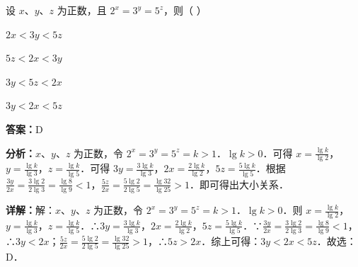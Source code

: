 \begin{question}[points=5]
设 $x$、$y$、$z$ 为正数，且 $2^x=3^y=5^z$，则（ ）
\begin{choices}
  \item $2x<3y<5z$
  \item $5z<2x<3y$
  \item $3y<5z<2x$
  \item $3y<2x<5z$
\end{choices}
\begin{solution}
\textbf{答案：}D

\textbf{分析：}$x$、$y$、$z$ 为正数，令 $2^x=3^y=5^z=k>1$．$\lg k>0$．可得 $x=\frac{\lg k}{\lg 2}$，$y=\frac{\lg k}{\lg 3}$，$z=\frac{\lg k}{\lg 5}$．可得 $3y=\frac{3\lg k}{\lg 3}$，$2x=\frac{2\lg k}{\lg 2}$，$5z=\frac{5\lg k}{\lg 5}$．根据 $\frac{3y}{2x}=\frac{3\lg 2}{2\lg 3}=\frac{\lg 8}{\lg 9}<1$，$\frac{5z}{2x}=\frac{5\lg 2}{2\lg 5}=\frac{\lg 32}{\lg 25}>1$．即可得出大小关系．

\textbf{详解：}解：$x$、$y$、$z$ 为正数，令 $2^x=3^y=5^z=k>1$．$\lg k>0$．则 $x=\frac{\lg k}{\lg 2}$，$y=\frac{\lg k}{\lg 3}$，$z=\frac{\lg k}{\lg 5}$．∴$3y=\frac{3\lg k}{\lg 3}$，$2x=\frac{2\lg k}{\lg 2}$，$5z=\frac{5\lg k}{\lg 5}$．∵$\frac{3y}{2x}=\frac{3\lg 2}{2\lg 3}=\frac{\lg 8}{\lg 9}<1$，∴$3y<2x$；$\frac{5z}{2x}=\frac{5\lg 2}{2\lg 5}=\frac{\lg 32}{\lg 25}>1$，∴$5z>2x$．综上可得：$3y<2x<5z$．故选：D．
\end{solution}
\end{question}

